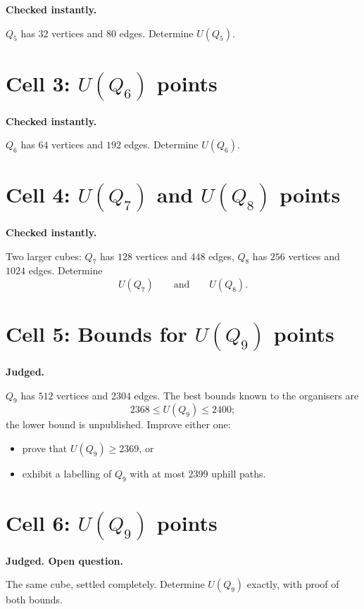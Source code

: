 \documentclass[11pt]{article}
\theoremstyle{definition}
\newcommand{\cell}[3]{%
  \section*{Cell #1: #2\hfill{\normalsize\mdseries #3}}}
\begin{document}
\textbf{Checked instantly.}

$Q_5$ has $32$ vertices and $80$ edges. Determine $U(Q_5)$.

\cell{3}{$U(Q_6)$}{3 points}

\textbf{Checked instantly.}

$Q_6$ has $64$ vertices and $192$ edges. Determine $U(Q_6)$.

\cell{4}{$U(Q_7)$ and $U(Q_8)$}{5 points}

\textbf{Checked instantly.}

Two larger cubes: $Q_7$ has $128$ vertices and $448$ edges, $Q_8$ has
$256$ vertices and $1024$ edges. Determine
\[
  U(Q_7) \qquad \text{and} \qquad U(Q_8).
\]

\cell{5}{Bounds for $U(Q_9)$}{8 points}

\textbf{Judged.}

$Q_9$ has $512$ vertices and $2304$ edges. The best bounds known to
the organisers are
\[
  2368 \leq U(Q_9) \leq 2400;
\]
the lower bound is unpublished. Improve either one:
\begin{itemize}[leftmargin=*]
  \item prove that $U(Q_9) \geq 2369$, or
  \item exhibit a labelling of $Q_9$ with at most $2399$ uphill paths.
\end{itemize}

\cell{6}{$U(Q_9)$}{13 points}

\textbf{Judged. Open question.}

The same cube, settled completely. Determine $U(Q_9)$ exactly, with
proof of both bounds.
\end{document}

